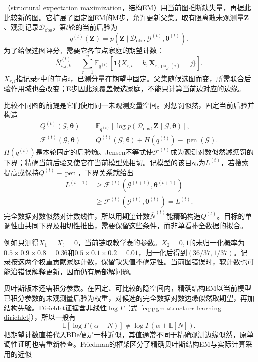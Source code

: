 （structural expectation maximization，结构EM）用当前图推断缺失量，再据此比较新的图。它扩展了固定图EM的M步，允许更新父集。取有限离散未观测量$\bm{Z}$、观测记录$\mathcal{D}_{\mathrm{obs}}$，第$t$轮的当前后验为
\[
  q^{(t)}(\bm{Z})
  =p(\bm{Z}\mid\mathcal{D}_{\mathrm{obs}},
                  \mathcal{G}^{(t)},\bm{\theta}^{(t)}).
\]
为了给候选图评分，需要它各节点家庭的期望计数：
\[
  \overline N_{i,j,k}^{(t)}
  =\sum_{r=1}^{n}
    \mathbb{E}_{q^{(t)}}\!
      \left[\mathbf{1}\{X_{r,i}=k,
        \bm{X}_{r,\operatorname{pa}_{\mathcal{G}}(i)}=j\}\right].
\]
$X_{r,i}$指记录$r$中的节点$i$，已测分量在期望中固定。父集随候选图而变，所需联合后验作用域也会改变；E步因此须覆盖候选家庭，不能只计算当前边对应的边缘。

比较不同图的前提是它们使用同一未观测变量空间。对惩罚似然，固定当前后验并构造
\begin{equation}
  \begin{aligned}
    Q^{(t)}(\mathcal{G},\bm{\theta})
      &=\mathbb{E}_{q^{(t)}}[
          \log p(\mathcal{D}_{\mathrm{obs}},\bm{Z}
                     \mid\mathcal{G},\bm{\theta})],\\
    \mathcal{F}^{(t)}(\mathcal{G},\bm{\theta})
      &=Q^{(t)}(\mathcal{G},\bm{\theta})+H(q^{(t)})
        -\operatorname{pen}(\mathcal{G}).
  \end{aligned}
  \label{eq:pgm-structure-learning-sem-bound}
\end{equation}
$H(q^{(t)})$是本轮固定的后验熵。Jensen不等式使$\mathcal{F}^{(t)}$成为观测对数似然减惩罚的下界；精确当前后验又使它在当前模型处相切。记模型的该目标为$L^{(t)}$，若搜索提高或保持$Q^{(t)}-\operatorname{pen}$，下界关系就给出
\[
  \begin{aligned}
    L^{(t+1)}
    &\geq \mathcal{F}^{(t)}(\mathcal{G}^{(t+1)},\bm{\theta}^{(t+1)})\\
    &\geq \mathcal{F}^{(t)}(\mathcal{G}^{(t)},\bm{\theta}^{(t)})
     =L^{(t)}.
  \end{aligned}
\]
完全数据对数似然对计数线性，所以用期望计数$\overline N^{(t)}$能精确构造$Q^{(t)}$。目标的单调性由共同下界及相切性推出，需要保留这些条件，而非单看补全数据的拟合。

例如只测得$X_1=X_3=0$，当前链取教学表的参数。$X_2=0,1$的未归一化概率为$0.5\times0.9\times0.8=0.36$和$0.5\times0.1\times0.2=0.01$，归一化后得到$(36/37,1/37)$。记录按这两个权重贡献家庭计数，保留缺失值不确定性。当前图错误时，软计数也可能沿错误解释更新，因而仍有局部解问题。

贝叶斯版本还需积分参数。在固定、可比较的隐空间内，精确结构EM以当前模型已积分参数的未观测量后验为权重，对候选的完全数据对数边缘似然取期望，再加结构先验。Dirichlet证据含非线性$\log\Gamma$（式~\eqref{eq:pgm-structure-learning-dirichlet}），所以一般有
\[
  \mathbb{E}[\log\Gamma(\alpha+N)]
  \ne\log\Gamma(\alpha+\mathbb{E}[N]).
\]
把期望计数直接代入BDe便是一种近似，其值通常不同于精确观测边缘似然，原单调性证明也需重新检查。Friedman的框架区分了精确贝叶斯结构EM与实际计算采用的近似


